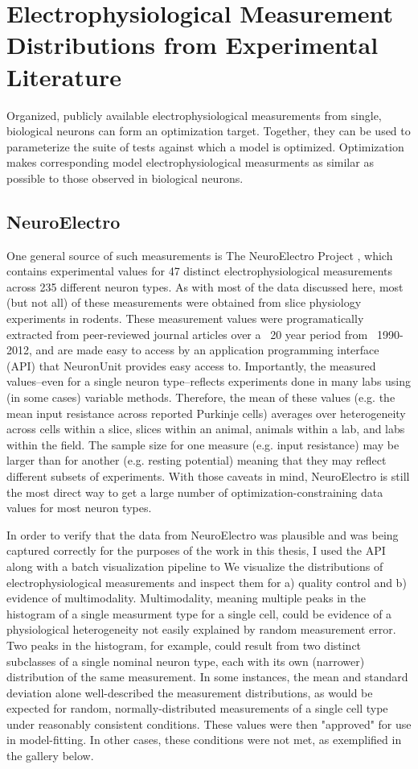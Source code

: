 \section{Electrophysiological Measurement Distributions from Experimental Literature}\label{section:nelectro}
Organized, publicly available electrophysiological measurements from single, biological neurons can form an optimization target.
Together, they can be used to parameterize the suite of tests against which a model is optimized.
Optimization makes corresponding model electrophysiological measurments as similar as possible to those observed in biological neurons.

\subsection{NeuroElectro}
One general source of such measurements is The NeuroElectro Project \cite{tripathy2014neuroelectro}, which contains experimental values for 47 distinct electrophysiological measurements across 235 different neuron types.
As with most of the data discussed here, most (but not all) of these measurements were obtained from slice physiology experiments in rodents.
These measurement values were programatically extracted from peer-reviewed journal articles over a ~20 year period from ~1990-2012,
and are made easy to access by an application programming interface (API) that NeuronUnit provides easy access to.
Importantly, the measured values--even for a single neuron type--reflects experiments done in many labs using (in some cases) variable methods.
Therefore, the mean of these values (e.g. the mean input resistance across reported Purkinje cells) averages over heterogeneity across cells within a slice, slices within an animal, animals within a lab, and labs within the field.
The sample size for one measure (e.g. input resistance) may be larger than for another (e.g. resting potential) meaning that they may reflect different subsets of experiments.
With those caveats in mind, NeuroElectro is still the most direct way to get a large number of optimization-constraining data values for most neuron types.

In order to verify that the data from NeuroElectro was plausible and was being captured correctly for the purposes of the work in this thesis, I used the API along with a batch visualization pipeline to We visualize the distributions of electrophysiological measurements and inspect them for a) quality control and b) evidence of multimodality.
Multimodality, meaning multiple peaks in the histogram of a single measurment type for a single cell, could be evidence of a physiological heterogeneity not easily explained by random measurement error.
Two peaks in the histogram, for example, could result from two distinct subclasses of a single nominal neuron type, each with its own (narrower) distribution of the same measurement.
In some instances, the mean and standard deviation alone well-described the measurement distributions, as would be expected for random, normally-distributed measurements of a single cell type under reasonably consistent conditions.
These values were then "approved" for use in model-fitting.
In other cases, these conditions were not met, as exemplified in the gallery below.

